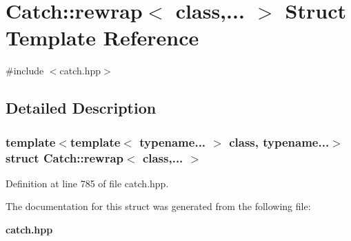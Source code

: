 \section{Catch\+::rewrap$<$ class,... $>$ Struct Template Reference}
\label{struct_catch_1_1rewrap}


{\ttfamily \#include $<$catch.\+hpp$>$}



\subsection{Detailed Description}
\subsubsection*{template$<$template$<$ typename... $>$ class, typename...$>$\newline
struct Catch\+::rewrap$<$ class,... $>$}



Definition at line 785 of file catch.\+hpp.



The documentation for this struct was generated from the following file\+:\begin{DoxyCompactItemize}
\item 
\textbf{ catch.\+hpp}\end{DoxyCompactItemize}
